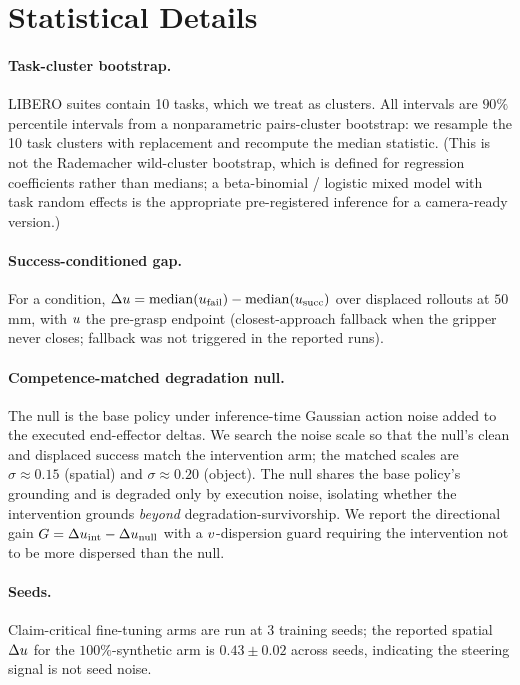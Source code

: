 \section{Statistical Details}
\label{app:stats}

\paragraph{Task-cluster bootstrap.}
LIBERO suites contain 10 tasks, which we treat as clusters. All intervals are $90\%$
percentile intervals from a nonparametric pairs-cluster bootstrap: we resample the 10 task
clusters with replacement and recompute the median statistic. (This is not the Rademacher
wild-cluster bootstrap, which is defined for regression coefficients rather than medians; a
beta-binomial / logistic mixed model with task random effects is the appropriate
pre-registered inference for a camera-ready version.)

\paragraph{Success-conditioned gap.}
For a condition, $\Delta u = \mathrm{median}(u_{\mathrm{fail}}) - \mathrm{median}(u_{\mathrm{succ}})$ over displaced
rollouts at $50$\,mm, with $u$ the pre-grasp endpoint (closest-approach fallback when the
gripper never closes; fallback was not triggered in the reported runs).

\paragraph{Competence-matched degradation null.}
The null is the base policy under inference-time Gaussian action noise added to the
executed end-effector deltas. We search the noise scale so that the null's clean and
displaced success match the intervention arm; the matched scales are $\sigma\!\approx\!0.15$
(spatial) and $\sigma\!\approx\!0.20$ (object). The null shares the base policy's grounding
and is degraded only by execution noise, isolating whether the intervention grounds
\emph{beyond} degradation-survivorship. We report the directional gain
$G = \Delta u_{\mathrm{int}} - \Delta u_{\mathrm{null}}$ with a $v$-dispersion guard requiring
the intervention not to be more dispersed than the null.

\paragraph{Seeds.}
Claim-critical fine-tuning arms are run at 3 training seeds; the reported spatial $\Delta u$
for the $100\%$-synthetic arm is $0.43 \pm 0.02$ across seeds, indicating the steering
signal is not seed noise.

